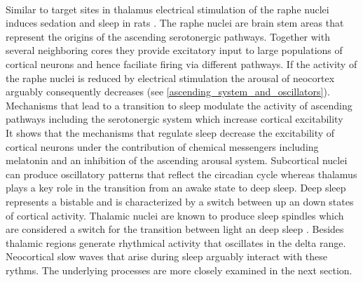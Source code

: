 \\Similar to target sites in thalamus electrical stimulation of the raphe nuclei induces sedation and sleep in rats \parencite{kostowski1969electrical}. The raphe nuclei are brain stem areas that represent the origins of the ascending serotonergic pathways. Together with several neighboring cores they provide excitatory input to large populations of cortical neurons and hence faciliate firing via different pathways. If the activity of the raphe nuclei is reduced by electrical stimulation the arousal of neocortex arguably consequently decreases (see \ref{ascending_system_and_oscillators}). Mechanisms that lead to a transition to sleep modulate the activity of ascending pathways including the serotonergic system which increase cortical excitability\\
It shows that the mechanisms that regulate sleep decrease the excitability of cortical neurons under the contribution of chemical messengers including melatonin and an inhibition of the ascending arousal system. Subcortical nuclei can produce oscillatory patterns that reflect the circadian cycle whereas thalamus plays a key role in the transition from an awake state to deep sleep. Deep sleep represents a bistable and is characterized by a switch between up an down states of cortical activity. Thalamic nuclei are known to produce sleep spindles which are considered a switch for the transition between light an deep sleep \parencite{montagna2005fatal}. Besides thalamic regions generate rhythmical activity that oscillates in the delta range. Neocortical slow waves that arise during sleep arguably interact with these rythms. The underlying processes are more closely examined in the next section.


